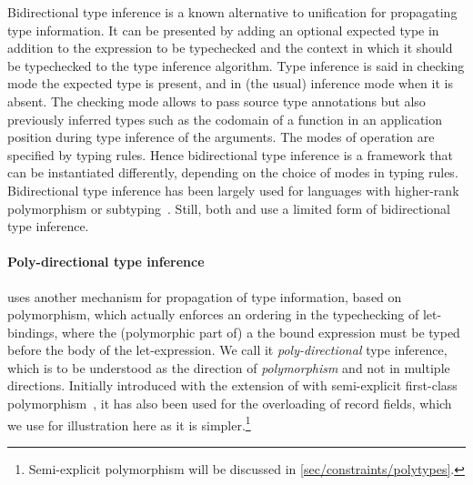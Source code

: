 \documentclass[acmsmall,screen,nonacm]{acmart}
\begin{document}
Bidirectional type inference is a known alternative to unification for
propagating type information. It can be presented by adding an optional
expected type in addition to the expression to be typechecked and the
context in which it should be typechecked to the type inference algorithm.
Type inference is said in checking mode the expected type is present, and in
(the usual) inference mode when it is absent. The checking mode allows to
pass source type annotations but also previously inferred types such as the
codomain of a function in an application position during type inference of
the arguments.  The modes of operation are specified by typing rules.  Hence
bidirectional type inference is a framework that can be instantiated
differently, depending on the choice of modes in typing rules.
Bidirectional type inference has been largely used for languages with
higher-rank polymorphism or subtyping~. Still, both \OCaml
and \Haskell use a limited form of bidirectional type inference.



\paragraph{Poly-directional type inference}

\OCaml uses another mechanism for propagation of type
information, based on polymorphism, which actually enforces an ordering in
the typechecking of let-bindings, where the (polymorphic part of) a the
bound expression must be typed before the body of the let-expression.  We
call it \emph{poly-directional} type inference, which is to be understood as
the direction of \emph{polymorphism} and not in multiple directions.
Initially introduced with the extension of \ML with semi-explicit
first-class polymorphism~\cite {Garrigue-Remy/poly-ml}, it has also been used
for the overloading of record fields, which we use for illustration here
as it is simpler.\footnote {Semi-explicit polymorphism will be discussed
in \cref{sec/constraints/polytypes}.}
\end{document}

